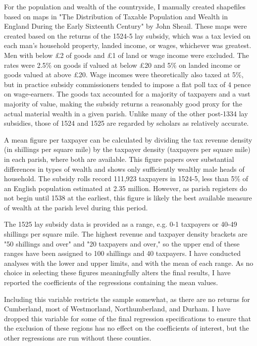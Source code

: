 \documentclass[12pt]{article}
\begin{document}
For the population and wealth of the countryside, I manually created shapefiles based on maps in "The Distribution of Taxable Population and Wealth in England During the Early Sixteenth Century" by John Sheail. These maps were created based on the returns of the 1524-5 lay subsidy, which was a tax levied on each man's household property, landed income, or wages, whichever was greatest. Men with below \pounds2 of goods and \pounds1 of land or wage income were excluded. The rates were 2.5\% on goods if valued at below \pounds20 and 5\% on landed income or goods valued at above \pounds20. Wage incomes were theoretically also taxed at 5\%, but in practice subsidy commissioners tended to impose a flat poll tax of 4 pence on wage-earners.\autocite[111-12]{Sheail1972} The goods tax accounted for a majority of taxpayers and a vast majority of value, making the subsidy returns a reasonably good proxy for the actual material wealth in a given parish.\autocite[112]{Sheail1972} Unlike many of the other post-1334 lay subsidies, those of 1524 and 1525 are regarded by scholars as relatively accurate.\autocite[202]{Hadwin1983} 

A mean figure per taxpayer can be calculated by dividing the tax revenue density (in shillings per square mile) by the taxpayer density (taxpayers per square mile) in each parish, where both are available. This figure papers over substantial differences in types of wealth and shows only sufficiently wealthy male heads of household. The subsidy rolls record 111,923 taxpayers in 1524-5,\autocite[115]{Sheail1972} less than 5\% of an English population estimated at 2.35 million.\autocite[20]{Broadberry2015} However, as parish registers do not begin until 1538 at the earliest, this figure is likely the best available measure of wealth at the parish level during this period.

The 1525 lay subsidy data is provided as a range, e.g. 0-1 taxpayers or 40-49 shillings per square mile. The highest revenue and taxpayer density brackets are "50 shillings and over" and "20 taxpayers and over," so the upper end of these ranges have been assigned to 100 shillings and 40 taxpayers. I have conducted analyses with the lower and upper limits, and with the mean of each range. As no choice in selecting these figures meaningfully alters the final results, I have reported the coefficients of the regressions containing the mean values.

Including this variable restricts the sample somewhat, as there are no returns for Cumberland, most of Westmorland, Northumberland, and Durham. I have dropped this variable for some of the final regression specifications to ensure that the exclusion of these regions has no effect on the coefficients of interest, but the other regressions are run without these counties.
\end{document}
